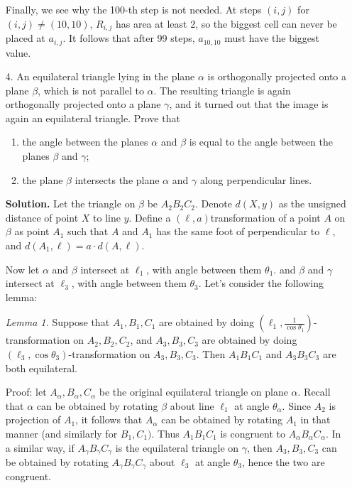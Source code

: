 \documentclass[11pt,a4paper]{article}
\begin{document}
\begin{enumerate}
	Finally, we see why the 100-th step is not needed. At steps $(i, j)$ for $(i, j)\neq (10, 10)$, $R_{i, j}$ has area at least 2, 
	so the biggest cell can never be placed at $a_{i, j}$. 
	It follows that after 99 steps, $a_{10, 10}$ must have the biggest value. 
	
	\item[4.]
	An equilateral triangle lying in the plane $\alpha$ is orthogonally projected onto a plane $\beta$, which is
	not parallel to $\alpha$. The resulting triangle is again orthogonally projected onto a plane $\gamma$, and it
	turned out that the image is again an equilateral triangle. Prove that
	\begin{enumerate}
		\item the angle between the planes $\alpha$ and $\beta$ is equal to the angle between the planes $\beta$ and $\gamma$;
		\item the plane $\beta$ intersects the plane $\alpha$ and $\gamma$ along perpendicular lines.
	\end{enumerate}

    \textbf{Solution.}
    Let the triangle on $\beta$ be $A_2B_2C_2$. 
    Denote $d(X, y)$ as the unsigned distance of point $X$ to line $y$. 
    Define a $(\ell, a)$transformation of a point $A$ on $\beta$ as point $A_1$ such that $A$ and $A_1$ has the same foot of perpendicular to $\ell$, 
    and $d(A_1, \ell)=a\cdot d(A, \ell)$. 
    
    Now let $\alpha$ and $\beta$ intersect at $\ell_{1}$, with angle between them $\theta_{1}$. 
    and $\beta$ and $\gamma$ intersect at $\ell_3$, with angle between them $\theta_3$. 
    Let's consider the following lemma: 
    
    \emph{Lemma 1.} Suppose that $A_1, B_1, C_1$ are obtained by doing 
    $(\ell_1, \frac{1}{\cos\theta_1})$-transformation on $A_2, B_2, C_2$, 
    and $A_3, B_3, C_3$ are obtained by doing $(\ell_3, \cos\theta_3)$-transformation on $A_3, B_3, C_3$. 
    Then $A_1B_1C_1$ and $A_3B_3C_3$ are both equilateral. 
    
    Proof: let $A_{\alpha}, B_{\alpha}, C_{\alpha}$ be the original equilateral triangle on 
    plane $\alpha$. 
    Recall that $\alpha$ can be obtained by rotating $\beta$ about line $\ell_{1}$ at angle $\theta_{\alpha}$. 
    Since $A_2$ is projection of $A_{1}$, 
    it follows that $A_{\alpha}$ can be obtained by rotating $A_1$ in that manner (and similarly for $B_1, C_1)$. 
    Thus $A_1B_1C_1$ is congruent to $A_{\alpha}B_{\alpha}C_{\alpha}$. 
    In a similar way, if $A_{\gamma}B_{\gamma}C_{\gamma}$ is the equilateral triangle on 
    $\gamma$, 
    then $A_3, B_3, C_3$ can be obtained by rotating $A_{\gamma}B_{\gamma}C_{\gamma}$ 
    about $\ell_{3}$ at angle $\theta_3$, 
    hence the two are congruent. 
    

\end{enumerate}
\end{document}
